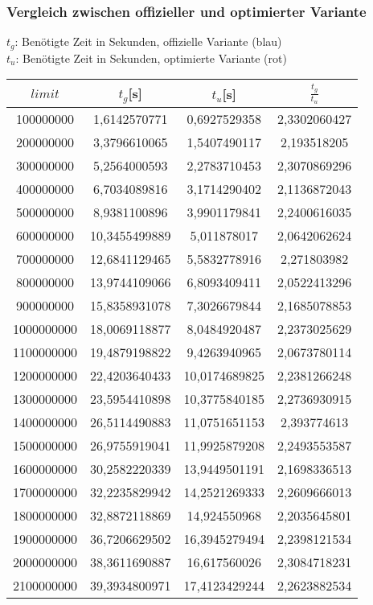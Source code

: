 \documentclass[a4paper,12pt]{article}
\begin{document}
\subsubsection{Vergleich zwischen offizieller und optimierter Variante}
$t_g$: Benötigte Zeit in Sekunden, offizielle Variante (blau)\\
$t_u$: Benötigte Zeit in Sekunden, optimierte Variante (rot)\\
\begin{tabular}{|c|c|c|c|}
\hline
$limit$ & $t_g$[s] & $t_u$[s] & $\frac{t_g}{t_u}$\\
\hline
100000000 & 1,6142570771 & 0,6927529358 & 2,3302060427\\
200000000 & 3,3796610065 & 1,5407490117 & 2,193518205\\
300000000 & 5,2564000593 & 2,2783710453 & 2,3070869296\\
400000000 & 6,7034089816 & 3,1714290402 & 2,1136872043\\
500000000 & 8,9381100896 & 3,9901179841 & 2,2400616035\\
600000000 & 10,3455499889 & 5,011878017 & 2,0642062624\\
700000000 & 12,6841129465 & 5,5832778916 & 2,271803982\\
800000000 & 13,9744109066 & 6,8093409411 & 2,0522413296\\
900000000 & 15,8358931078 & 7,3026679844 & 2,1685078853\\
1000000000 & 18,0069118877 & 8,0484920487 & 2,2373025629\\
1100000000 & 19,4879198822 & 9,4263940965 & 2,0673780114\\
1200000000 & 22,4203640433 & 10,0174689825 & 2,2381266248\\
1300000000 & 23,5954410898 & 10,3775840185 & 2,2736930915\\
1400000000 & 26,5114490883 & 11,0751651153 & 2,393774613\\
1500000000 & 26,9755919041 & 11,9925879208 & 2,2493553587\\
1600000000 & 30,2582220339 & 13,9449501191 & 2,1698336513\\
1700000000 & 32,2235829942 & 14,2521269333 & 2,2609666013\\
1800000000 & 32,8872118869 & 14,924550968 & 2,2035645801\\
1900000000 & 36,7206629502 & 16,3945279494 & 2,2398121534\\
2000000000 & 38,3611690887 & 16,617560026 & 2,3084718231\\
2100000000 & 39,3934800971 & 17,4123429244 & 2,2623882534\\

\end{tabular}
\end{document}
